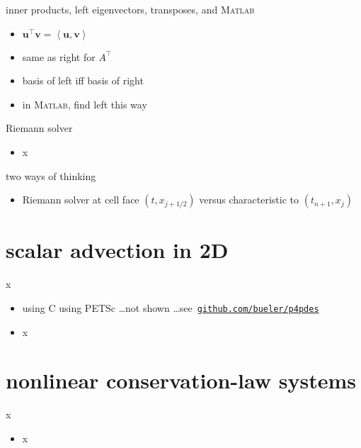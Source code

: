 \documentclass[10pt,hyperref]{beamer}
\newcommand{\bv}{\mathbf{v}}
\newcommand{\bu}{\mathbf{u}}
\newcommand{\Matlab}{\textsc{Matlab}\xspace}
\newcommand{\ip}[2]{\left<#1,#2\right>}
\begin{document}
\begin{frame}{inner products, left eigenvectors, transposes, and \Matlab}

\begin{itemize}
\item $\bu^\top \bv = \ip{\bu}{\bv}$
\item same as right for $A^\top$
\item basis of left iff basis of right
\item in \Matlab, find left this way
\end{itemize}
\end{frame}


\begin{frame}{Riemann solver}

\begin{itemize}
\item x
\end{itemize}
\end{frame}


\begin{frame}{two ways of thinking}

\begin{itemize}
\item Riemann solver at cell face $(t,x_{j+1/2})$ versus characteristic to $(t_{n+1},x_j)$
\end{itemize}
\end{frame}

\section{scalar advection in 2D}

\begin{frame}{x}

\begin{itemize}
\item using C using PETSc \dots not shown \dots see \,\href{https://github.com/bueler/p4pdes}{\texttt{github.com/bueler/p4pdes}}
\item x
\end{itemize}
\end{frame}


\section{nonlinear conservation-law systems}

\begin{frame}{x}

\begin{itemize}
\item x
\end{itemize}
\end{frame}
\end{document}
